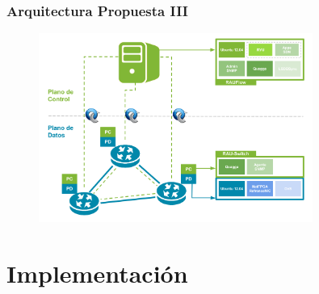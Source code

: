 \documentclass{beamer}
\begin{document}
\begin{frame}
\frametitle{Arquitectura Propuesta III} 

\begin{figure}[H]
\centering
\includegraphics[width=0.80\textwidth]{imagenes/arquitecturapropuesta1.png}
\end{figure}

\end{frame}


\section{Implementaci\'on} 
\frame{\tableofcontents[currentsection]}

%
%
\end{document}

